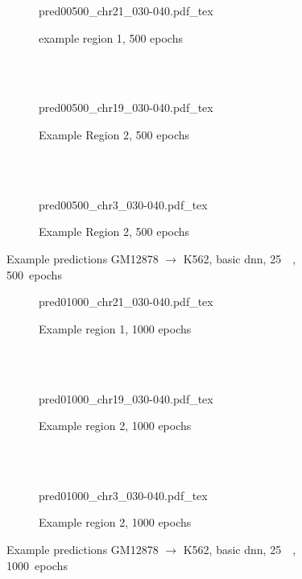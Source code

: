 \begin{figure}[p]
    \begin{subfigure}{\textwidth}
        \centering
        \scriptsize
        {pred00500_chr21_030-040.pdf_tex}
        \caption{example  region 1, 500 epochs} \label{fig:results:basic_r1}
    \end{subfigure}\\[2mm]
    \\[3mm]
    \begin{subfigure}{\textwidth}
        \centering
        \scriptsize
        {pred00500_chr19_030-040.pdf_tex}
        \caption{Example Region 2, 500 epochs} \label{fig:results:basic_r2}
    \end{subfigure}\\[2mm]
    \\[3mm]
    \begin{subfigure}{\textwidth}
        \centering
        \scriptsize
        {pred00500_chr3_030-040.pdf_tex}
        \caption{Example Region 2, 500 epochs} \label{fig:results:basic_r3}
    \end{subfigure}
    \caption{Example predictions GM12878 $\rightarrow$ K562, basic \acrshort{dnn}, \SI{25}{\kilo\bp}, 500~epochs} \label{fig:results:basic500}
\end{figure}
\begin{figure}[p]
    \begin{subfigure}{\textwidth}
        \centering
        \scriptsize
        {pred01000_chr21_030-040.pdf_tex}
        \caption{Example region 1, 1000 epochs} \label{fig:results:basic_r1_1000}
    \end{subfigure}\\[2mm]
    \\[3mm]
    \begin{subfigure}{\textwidth}
        \centering
        \scriptsize
        {pred01000_chr19_030-040.pdf_tex}
        \caption{Example region 2, 1000 epochs} \label{fig:results:basic_r2_1000}
    \end{subfigure}\\[2mm]
    \\[3mm]
    \begin{subfigure}{\textwidth}
        \centering
        \scriptsize
        {pred01000_chr3_030-040.pdf_tex}
        \caption{Example region 2, 1000 epochs} \label{fig:results:basic_r3_1000}
    \end{subfigure}
    \caption{Example predictions GM12878 $\rightarrow$ K562, basic \acrshort{dnn}, \SI{25}{\kilo\bp}, 1000~epochs} \label{fig:results:basic1000}
\end{figure}
